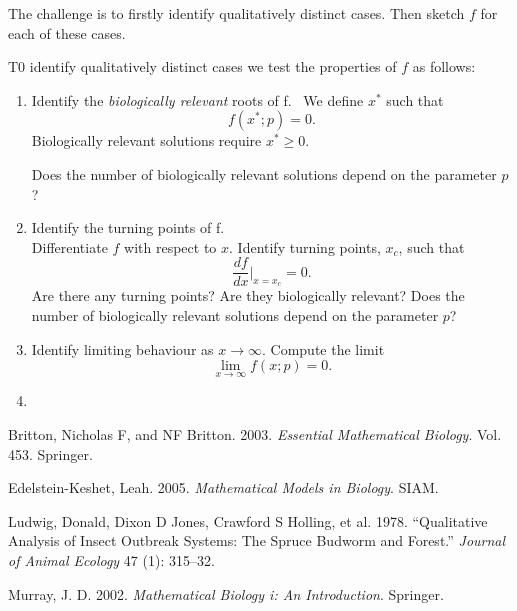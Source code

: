 \documentclass[
  letterpaper,
  DIV=11,
  numbers=noendperiod]{scrreprt}
\newlength{\cslhangindent}
\newenvironment{CSLReferences}[2] %
 {\begin{list}{}{%
  \setlength{\itemindent}{0pt}
  \setlength{\leftmargin}{0pt}
  \setlength{\parsep}{0pt}
  \ifodd #1
   \setlength{\leftmargin}{\cslhangindent}
   \setlength{\itemindent}{-1\cslhangindent}
  \fi
  \setlength{\itemsep}{#2\baselineskip}}}
 {\end{list}}
\begin{document}
The challenge is to firstly identify qualitatively distinct cases. Then
sketch \(f\) for each of these cases.

T0 identify qualitatively distinct cases we test the properties of \(f\)
as follows:

\begin{enumerate}
\def\labelenumi{\arabic{enumi}.}
\item
  Identify the \emph{biologically relevant} roots of f.~ We define
  \(x^*\) such that \[ 
   f(x^*;p)=0.
   \] Biologically relevant solutions require \(x^*\geq0\).

  Does the number of biologically relevant solutions depend on the
  parameter \(p\)?
\item
  Identify the turning points of f.\\
  Differentiate \(f\) with respect to \(x\). Identify turning points,
  \(x_c\), such that \[
       \frac{df}{dx}\bigg|_{x=x_c}=0.
  \] Are there any turning points? Are they biologically relevant? Does
  the number of biologically relevant solutions depend on the parameter
  \(p\)?
\item
  Identify limiting behaviour as \(x\rightarrow \infty\). Compute the
  limit \[
   \lim_{x\rightarrow \infty}f(x;p)=0.
  \]
\item
\end{enumerate}

\protect{}\label{refs}
\begin{CSLReferences}{1}{1}
Britton, Nicholas F, and NF Britton. 2003. \emph{Essential Mathematical
Biology}. Vol. 453. Springer.

Edelstein-Keshet, Leah. 2005. \emph{Mathematical Models in Biology}.
SIAM.

{Ludwig, Donald, Dixon D Jones, Crawford S Holling, et al.} 1978.
{``Qualitative Analysis of Insect Outbreak Systems: The Spruce Budworm
and Forest.''} \emph{Journal of Animal Ecology} 47 (1): 315--32.

Murray, J. D. 2002. \emph{Mathematical Biology i: An Introduction}.
Springer.

\end{CSLReferences}
\end{document}
